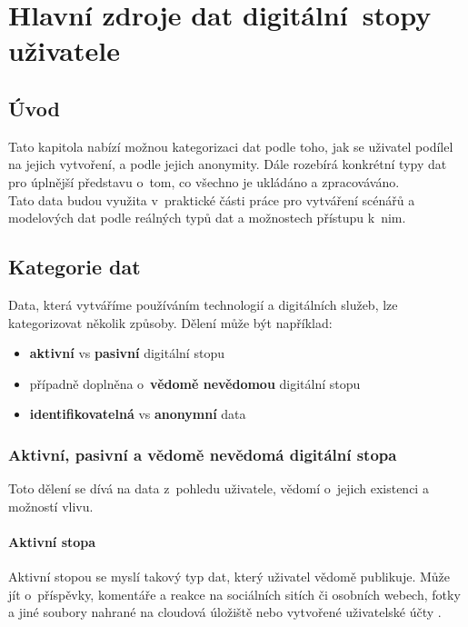 \chapter{Hlavní zdroje dat digitální~stopy\\ uživatele}

\section*{Úvod}
Tato kapitola nabízí možnou kategorizaci dat podle toho, jak se uživatel podílel na jejich vytvoření, a podle jejich anonymity. Dále rozebírá konkrétní typy dat pro úplnější představu o~tom, co všechno je ukládáno a zpracováváno.\\
Tato data budou využita v~praktické části práce pro vytváření scénářů a modelových dat podle reálných typů dat a možnostech přístupu k~nim.

\section{Kategorie dat}
Data, která vytváříme používáním technologií a digitálních služeb, lze kategorizovat několik způsoby. Dělení může být například:
\begin{itemize}
	\item \textbf{aktivní} vs \textbf{pasivní} digitální stopu \citep{pew-digital-footprint}
    \item případně doplněna o~\textbf{vědomě nevědomou} digitální stopu \citep{fish-digital-footprint}
	\item \textbf{identifikovatelná} vs \textbf{anonymní} data 
\end{itemize}


\subsection{Aktivní, pasivní a vědomě nevědomá digitální stopa}
Toto dělení se dívá na data z~pohledu uživatele, vědomí o~jejich existenci a možností vlivu. 

\subsubsection*{Aktivní stopa}
Aktivní stopou se myslí takový typ dat, který uživatel vědomě publikuje. Může jít o~příspěvky, komentáře a reakce na sociálních sitích či osobních webech, fotky a jiné soubory nahrané na cloudová úložiště nebo vytvořené uživatelské účty \citep{pew-digital-footprint}.

